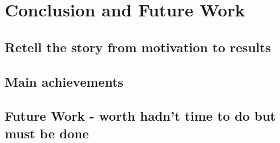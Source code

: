 \chapter{Conclusion and Future Work}

\section{Retell the story from motivation to results}

\section{Main achievements}

\section{Future Work - worth hadn't time to do but must be done}